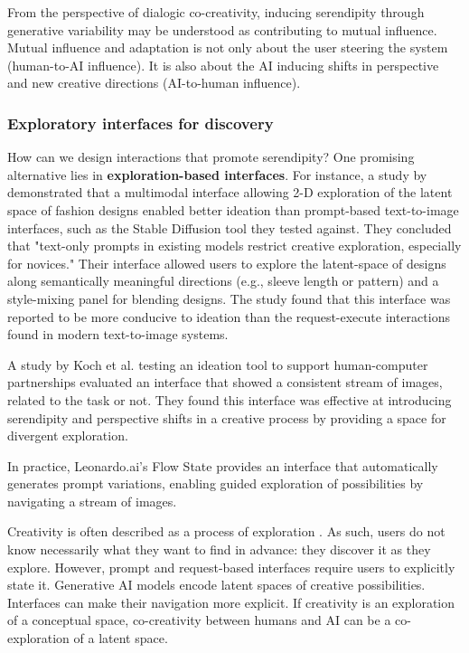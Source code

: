 From the perspective of dialogic co-creativity, inducing serendipity through generative variability may be understood as contributing to mutual influence. Mutual influence and adaptation is not only about the user steering the system (human-to-AI influence). It is also about the AI inducing shifts in perspective and new creative directions (AI-to-human influence). 

\subsubsection{Exploratory interfaces for discovery}

How can we design interactions that promote serendipity? One promising alternative lies in \textbf{exploration-based interfaces}. For instance, a study by \cite{Davis2024-ml} demonstrated that a multimodal interface allowing 2-D exploration of the latent space of fashion designs enabled better ideation than prompt-based text-to-image interfaces, such as the Stable Diffusion tool they tested against. They concluded that "text-only prompts in existing models restrict creative exploration, especially for novices." Their interface allowed users to explore the latent-space of designs along semantically meaningful directions (e.g., sleeve length or pattern) and a style-mixing panel for blending designs. The study found that this interface was reported to be more conducive to ideation than the request-execute interactions found in modern text-to-image systems. 

A study by Koch et al. \cite{Koch2020-gx} testing an ideation tool to support human-computer partnerships evaluated an interface that showed a consistent stream of images, related to the task or not. They found this interface was effective at introducing serendipity and perspective shifts in a creative process by providing a space for divergent exploration.

In practice, Leonardo.ai's Flow State provides an interface that automatically generates prompt variations, enabling guided exploration of possibilities by navigating a stream of images. 

Creativity is often described as a process of exploration \cite{Boden1998-yn, Wiggins2019-yj}. As such, users do not know necessarily what they want to find in advance: they discover it as they explore. However, prompt and request-based interfaces require users to explicitly state it. Generative AI models encode latent spaces of creative possibilities. Interfaces can make their navigation more explicit. If creativity is an exploration of a conceptual space, co-creativity between humans and AI can be a co-exploration of a latent space.  

